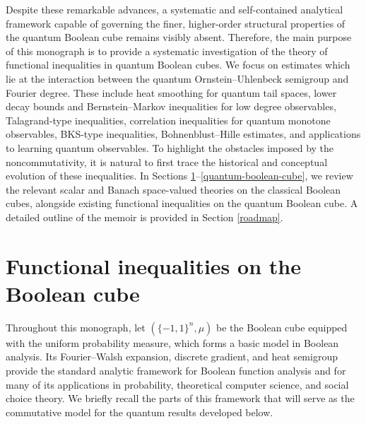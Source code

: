 \documentclass{amsbook}
\theoremstyle{definition}
\theoremstyle{remark}
\numberwithin{section}{chapter}
\numberwithin{equation}{chapter}
\newcommand{\1}{\mathbf{1}}
\begin{document}
Despite these remarkable advances, a systematic and self-contained analytical framework capable of governing the finer, higher-order structural properties of the quantum Boolean cube remains visibly absent. Therefore, the main purpose of this monograph is to provide a systematic investigation of the theory of functional inequalities in quantum Boolean cubes. We focus on estimates which lie at the interaction
between the quantum Ornstein--Uhlenbeck semigroup and Fourier degree. These include heat smoothing for quantum tail spaces, lower decay bounds and Bernstein--Markov inequalities for low degree observables, Talagrand-type inequalities, correlation inequalities for quantum monotone observables, BKS-type inequalities, Bohnenblust--Hille estimates, and applications to learning quantum observables. To highlight the obstacles imposed by the noncommutativity, it is natural to first trace the historical and conceptual evolution of these inequalities. In Sections \ref{boolean-cube}--\ref{quantum-boolean-cube}, we review the relevant scalar and Banach space-valued theories on the classical Boolean cubes, alongside existing functional inequalities on the quantum Boolean cube. A detailed outline of the memoir is provided in Section \ref{roadmap}.

\section{Functional inequalities on the Boolean cube}\label{boolean-cube}
 Throughout this monograph, let $(\{-1,1\}^{n},\mu)$ be the Boolean cube equipped with the uniform probability measure, which forms a basic model in Boolean analysis. Its Fourier--Walsh expansion, discrete gradient, and heat semigroup provide the standard analytic framework for Boolean function analysis and for many of its applications in probability, theoretical computer science, and social choice theory. We briefly recall the parts of this framework that will serve as the commutative model for the quantum results
developed below.
\end{document}
